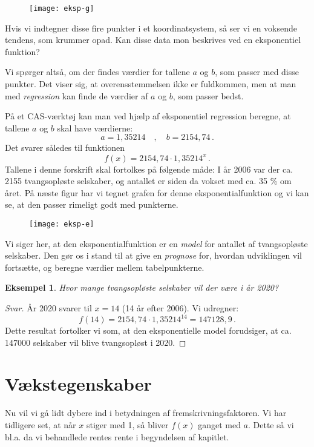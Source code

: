 \documentclass[12pt,oneside,a4paper]{article}
\theoremstyle{plain}
\newtheorem*{eks}{Eksempel}
\begin{document}
\begin{figure}[ht]
    \centering
    \texttt{[image: eksp-g]}
\end{figure}

Hvis vi indtegner disse fire punkter i et koordinatsystem, så ser vi en
voksende tendens, som krummer opad. Kan disse data mon beskrives ved en
eksponentiel funktion?

Vi spørger altså, om der findes værdier for tallene $a$ og $b$, som passer med
disse punkter. Det viser sig, at overensstemmelsen ikke er fuldkommen, men at man
med {\em regression} kan finde de værdier af $a$ og $b$, som passer bedst.

På et CAS-værktøj kan man ved hjælp af eksponentiel regression beregne, at
tallene $a$ og $b$ skal have værdierne: 
$$
a = 1,35214\quad,\quad b = 2154,74\,.
$$
Det svarer således til funktionen 
$$
f(x) = 2154,74 \cdot 1,35214 ^x\,.
$$
Tallene i denne forskrift skal fortolkes på følgende måde: I år 2006 var der
ca. 2155 tvangsopløste selskaber, og antallet er siden da vokset med ca. 35 \%
om året.  På næste figur har vi tegnet grafen for denne eksponentialfunktion
og vi kan se, at den passer rimeligt godt med punkterne.

\begin{figure}[ht]
    \centering
    \texttt{[image: eksp-e]}
    \label{eksp-e}
\end{figure}

Vi siger her, at den eksponentialfunktion er en {\em model} for antallet af
tvangsopløste selskaber. Den gør os i stand til at give en {\em prognose} for, hvordan
udviklingen vil fortsætte, og beregne værdier mellem tabelpunkterne.

\begin{eks}
    Hvor mange tvangsopløste selskaber vil der være i år 2020?
\end{eks}
\begin{proof}[Svar]
    År 2020 svarer til $x=14$ (14 år efter 2006). Vi udregner:
    $$
    f(14) = 2154,74 \cdot 1,35214^{14} = 147128,9\,.
    $$
    Dette resultat fortolker vi som, at den eksponentielle
    model forudsiger, at ca. 147000 selskaber vil blive tvangsopløst i 2020.
\end{proof}
    

\section*{Vækstegenskaber}
Nu vil vi gå lidt dybere ind i betydningen af fremskrivningsfaktoren. Vi har tidligere
set, at når $x$ stiger med 1, så bliver $f(x)$ ganget med $a$. Dette så vi bl.a. da
vi behandlede rentes rente i begyndelsen af kapitlet.
\end{document}
